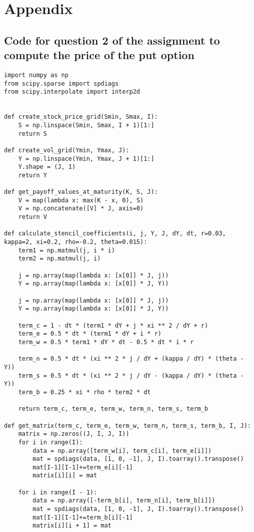\documentclass{article}
\begin{document}
\section{Appendix}
\subsection{Code for question 2 of the assignment to compute the price of the put option}
\begin{lstlisting}
import numpy as np
from scipy.sparse import spdiags
from scipy.interpolate import interp2d


def create_stock_price_grid(Smin, Smax, I):
    S = np.linspace(Smin, Smax, I + 1)[1:]
    return S

def create_vol_grid(Ymin, Ymax, J):
    Y = np.linspace(Ymin, Ymax, J + 1)[1:]
    Y.shape = (J, 1)
    return Y

def get_payoff_values_at_maturity(K, S, J):
    V = map(lambda x: max(K - x, 0), S)
    V = np.concatenate([V] * J, axis=0)
    return V

def calculate_stencil_coefficients(i, j, Y, J, dY, dt, r=0.03, kappa=2, xi=0.2, rho=-0.2, theta=0.015):
    term1 = np.matmul(j, i * i)
    term2 = np.matmul(j, i)

    j = np.array(map(lambda x: [x[0]] * J, j))
    Y = np.array(map(lambda x: [x[0]] * J, Y))

    j = np.array(map(lambda x: [x[0]] * J, j))
    Y = np.array(map(lambda x: [x[0]] * J, Y))

    term_c = 1 - dt * (term1 * dY + j * xi ** 2 / dY + r)
    term_e = 0.5 * dt * (term1 * dY + i * r)
    term_w = 0.5 * term1 * dY * dt - 0.5 * dt * i * r

    term_n = 0.5 * dt * (xi ** 2 * j / dY + (kappa / dY) * (theta - Y))
    term_s = 0.5 * dt * (xi ** 2 * j / dY - (kappa / dY) * (theta - Y))
    term_b = 0.25 * xi * rho * term2 * dt

    return term_c, term_e, term_w, term_n, term_s, term_b

def get_matrix(term_c, term_e, term_w, term_n, term_s, term_b, I, J):
    matrix = np.zeros((J, I, J, I))
    for i in range(I):
        data = np.array([term_w[i], term_c[i], term_e[i]])
        mat = spdiags(data, [1, 0, -1], J, I).toarray().transpose()
        mat[I-1][I-1]+=term_e[i][-1]
        matrix[i][i] = mat

    for i in range(I - 1):
        data = np.array([-term_b[i], term_n[i], term_b[i]])
        mat = spdiags(data, [1, 0, -1], J, I).toarray().transpose()
        mat[I-1][I-1]+=term_b[i][-1]
        matrix[i][i + 1] = mat


\end{lstlisting}
\end{document}
